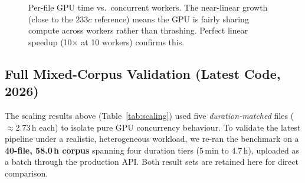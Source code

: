 \documentclass[conference,10pt]{IEEEtran}
\begin{document}
\begin{figure}[!t]
\centering
{}
\caption{Per-file GPU time vs.\ concurrent workers. The near-linear growth
  (close to the $233c$ reference) means the GPU is fairly sharing compute
  across workers rather than thrashing. Perfect linear speedup (10$\times$
  at 10 workers) confirms this.}
\label{fig:tradeoff}
\end{figure}

\subsection{Full Mixed-Corpus Validation (Latest Code, 2026)}
\label{sec:mixedcorpus}

The scaling results above (Table~\ref{tab:scaling}) used five \emph{duration-matched}
files ($\approx$2.73\,h each) to isolate pure GPU concurrency behaviour. To validate the
latest pipeline under a realistic, heterogeneous workload, we re-ran the benchmark on a
\textbf{40-file, 58.0\,h corpus} spanning four duration tiers (5\,min to 4.7\,h), uploaded
as a batch through the production API. Both result sets are retained here for direct
comparison.
\end{document}
